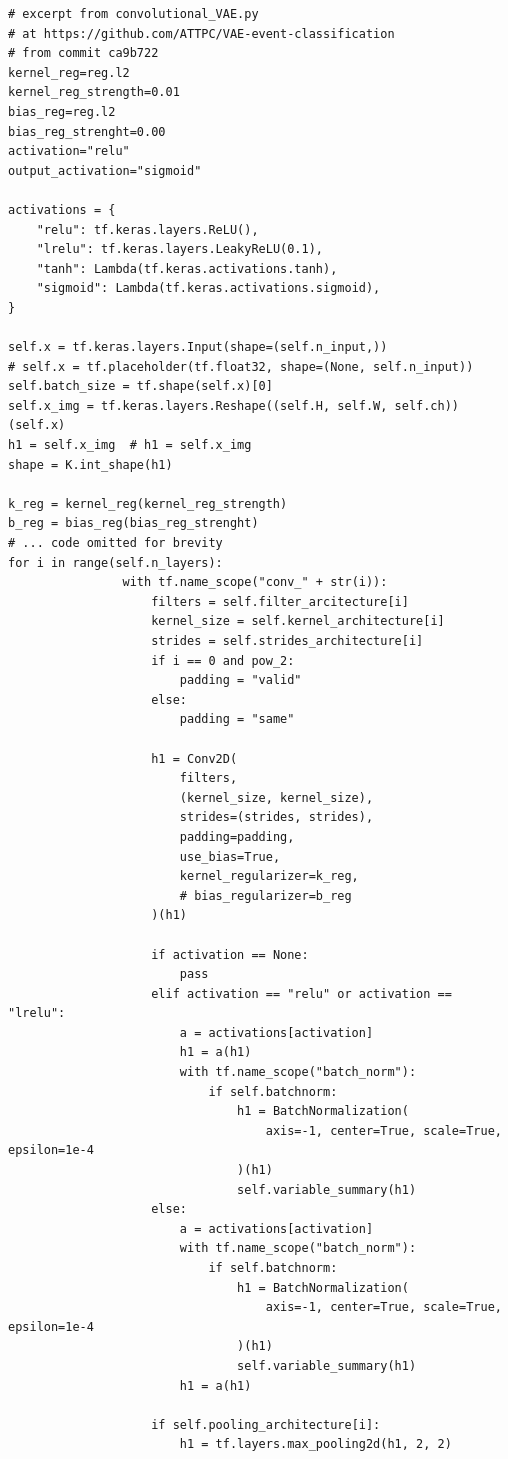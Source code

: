 \begin{lstlisting}[language=iPython]
# excerpt from convolutional_VAE.py
# at https://github.com/ATTPC/VAE-event-classification
# from commit ca9b722
kernel_reg=reg.l2
kernel_reg_strength=0.01
bias_reg=reg.l2
bias_reg_strenght=0.00
activation="relu"
output_activation="sigmoid"

activations = {
    "relu": tf.keras.layers.ReLU(),
    "lrelu": tf.keras.layers.LeakyReLU(0.1),
    "tanh": Lambda(tf.keras.activations.tanh),
    "sigmoid": Lambda(tf.keras.activations.sigmoid),
}

self.x = tf.keras.layers.Input(shape=(self.n_input,))
# self.x = tf.placeholder(tf.float32, shape=(None, self.n_input))
self.batch_size = tf.shape(self.x)[0]
self.x_img = tf.keras.layers.Reshape((self.H, self.W, self.ch))(self.x)
h1 = self.x_img  # h1 = self.x_img
shape = K.int_shape(h1)

k_reg = kernel_reg(kernel_reg_strength)
b_reg = bias_reg(bias_reg_strenght)
# ... code omitted for brevity
for i in range(self.n_layers):
                with tf.name_scope("conv_" + str(i)):
                    filters = self.filter_arcitecture[i]
                    kernel_size = self.kernel_architecture[i]
                    strides = self.strides_architecture[i]
                    if i == 0 and pow_2:
                        padding = "valid"
                    else:
                        padding = "same"

                    h1 = Conv2D(
                        filters,
                        (kernel_size, kernel_size),
                        strides=(strides, strides),
                        padding=padding,
                        use_bias=True,
                        kernel_regularizer=k_reg,
                        # bias_regularizer=b_reg
                    )(h1)

                    if activation == None:
                        pass
                    elif activation == "relu" or activation == "lrelu":
                        a = activations[activation]
                        h1 = a(h1)
                        with tf.name_scope("batch_norm"):
                            if self.batchnorm:
                                h1 = BatchNormalization(
                                    axis=-1, center=True, scale=True, epsilon=1e-4
                                )(h1)
                                self.variable_summary(h1)
                    else:
                        a = activations[activation]
                        with tf.name_scope("batch_norm"):
                            if self.batchnorm:
                                h1 = BatchNormalization(
                                    axis=-1, center=True, scale=True, epsilon=1e-4
                                )(h1)
                                self.variable_summary(h1)
                        h1 = a(h1)

                    if self.pooling_architecture[i]:
                        h1 = tf.layers.max_pooling2d(h1, 2, 2)

\end{lstlisting}

